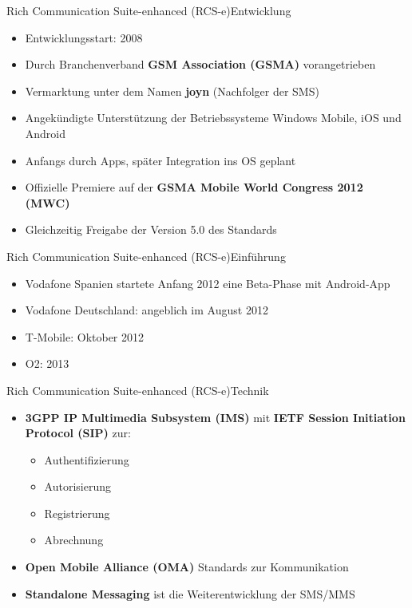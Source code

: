 \documentclass{beamer}
\begin{document}
\begin{frame}{Rich Communication Suite-enhanced (RCS-e)}{Entwicklung}
	\begin{itemize}
		\item Entwicklungsstart: 2008
		\item Durch Branchenverband \textbf{GSM Association (GSMA)} vorangetrieben
		\item Vermarktung unter dem Namen \textbf{joyn} (\glqq{}Nachfolger der SMS\grqq{})
		\item Angekündigte Unterstützung der Betriebssysteme Windows Mobile, iOS und Android
		\item Anfangs durch Apps, später Integration ins OS geplant
		\item Offizielle Premiere auf der \textbf{GSMA Mobile World Congress 2012 (MWC)}
		\item Gleichzeitig Freigabe der Version 5.0 des Standards
	\end{itemize}
\end{frame}

\begin{frame}{Rich Communication Suite-enhanced (RCS-e)}{Einführung}
\begin{itemize}
	\item Vodafone Spanien startete Anfang 2012 eine Beta-Phase mit Android-App
	\item Vodafone Deutschland: \glqq{}angeblich\grqq{} im August 2012
	\item T-Mobile: Oktober 2012
	\item O2: 2013
\end{itemize}
\end{frame}


\begin{frame}{Rich Communication Suite-enhanced (RCS-e)}{Technik\cite{rcs:spec}}
	\begin{itemize}
		\item \textbf{3GPP IP Multimedia Subsystem (IMS)} mit \textbf{IETF Session Initiation Protocol (SIP)} zur:
			\begin{itemize}
				\item Authentifizierung
				\item Autorisierung
				\item Registrierung
				\item Abrechnung
			\end{itemize}
		\item \textbf{Open Mobile Alliance (OMA)} Standards zur Kommunikation
		\item \textbf{Standalone Messaging} ist die Weiterentwicklung der SMS/MMS
	\end{itemize}
\end{frame}
\end{document}
